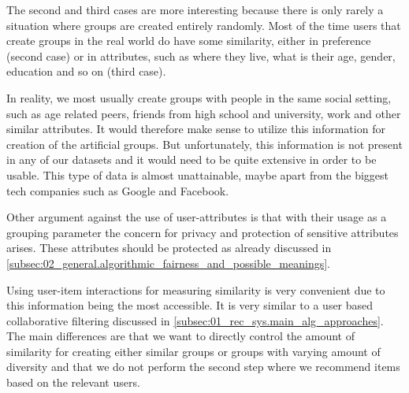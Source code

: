 The second and third cases are more interesting because there is only rarely a situation where groups are created entirely randomly. Most of the time users that create groups in the real world do have some similarity, either in preference (second case) or in attributes, such as where they live, what is their age, gender, education and so on (third case).

In reality, we most usually create groups with people in the same social setting, such as age related peers, friends from high school and university, work and other similar attributes. It would therefore make sense to utilize this information for creation of the artificial groups. But unfortunately, this information is not present in any of our datasets and it would need to be quite extensive in order to be usable. This type of data is almost unattainable, maybe apart from the biggest tech companies such as Google and Facebook.

Other argument against the use of user-attributes is that with their usage as a grouping parameter the concern for privacy and protection of sensitive attributes arises. These attributes should be protected as already discussed in \ref{subsec:02_general.algorithmic_fairness_and_possible_meanings}.

Using user-item interactions for measuring similarity is very convenient due to this information being the most accessible. It is very similar to a user based collaborative filtering discussed in \ref{subsec:01_rec_sys.main_alg_approaches}. The main differences are that we want to directly control the amount of similarity for creating either similar groups or groups with varying amount of diversity and that we do not perform the second step where we recommend items based on the relevant users.


